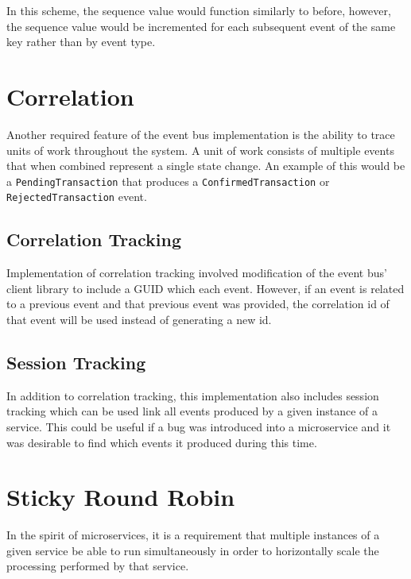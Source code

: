 \documentclass{l3proj}
\begin{document}


In this scheme, the sequence value would function similarly to before, however, the sequence value would be incremented for each subsequent event of the same key rather than by event type.

\section{Correlation}
\label{sec:correlation}

Another required feature of the event bus implementation is the ability to trace units of work throughout the system. A unit of work consists of multiple events that when combined represent a single state change. An example of this would be a \texttt{PendingTransaction} that produces a \texttt{ConfirmedTransaction} or \texttt{RejectedTransaction} event.

\subsection{Correlation Tracking}
Implementation of correlation tracking involved modification of the event bus' client library to include a GUID which each event. However, if an event is related to a previous event and that previous event was provided, the correlation id of that event will be used instead of generating a new id.

\subsection{Session Tracking}
In addition to correlation tracking, this implementation also includes session tracking which can be used link all events produced by a given instance of a service. This could be useful if a bug was introduced into a microservice and it was desirable to find which events it produced during this time.

\section{Sticky Round Robin}
\label{sec:sticky-round-robin}

In the spirit of microservices, it is a requirement that multiple instances of a given service be able to run simultaneously in order to horizontally scale the processing performed by that service.
\end{document}
